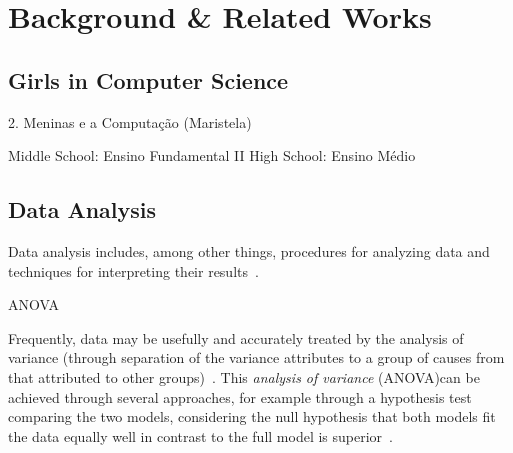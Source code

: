 \section{Background \& Related Works}\label{sec:background}%

\subsection{Girls in Computer Science}\label{subsec:background:girls}%
2. Meninas e a Computação (Maristela)

Middle School: Ensino Fundamental II
High School: Ensino Médio

\subsection{Data Analysis}\label{subsec:background:data}%

Data analysis includes, among other things, procedures for analyzing data and techniques for interpreting their results~\cite{Tukey1962}.

%
ANOVA ~\cite{Hastie2009}


Frequently, data may be usefully and accurately treated by the analysis of variance (through separation of the variance attributes to a group of causes from that attributed to other groups)~\cite{Fisher1934}. This \emph{analysis of variance} (ANOVA)can be achieved through several approaches, for example through a hypothesis test comparing the two models, considering the null hypothesis that both models fit the data equally well in contrast to  the full model is superior~\cite{James2013}.

%


